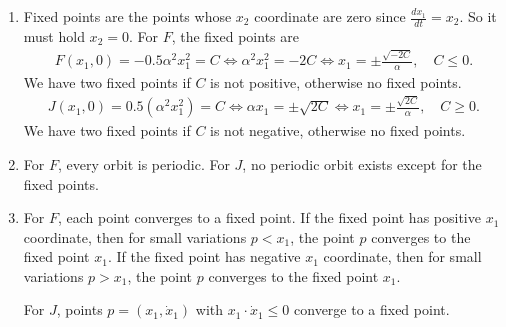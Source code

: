 \documentclass{article}
\theoremstyle{named}
\begin{document}
\begin{enumerate}[label=(\roman*)]
	\item Fixed points are the points whose $x_2$ coordinate are zero since $\frac{dx_1}{dt} = x_2$. So it must hold $x_2 = 0$. For $F$, the fixed points are
	\begin{align*}
		F(x_1,0) = -0.5\alpha^2x_1^2 = C \iff \alpha^2x_1^2 = -2C \iff x_1 = \pm \frac{\sqrt{-2C}}{\alpha}, \quad C \leq 0.
	\end{align*}
	We have two fixed points if $C$ is not positive, otherwise no fixed points.
	\begin{align*}
		J(x_1,0) = 0.5(\alpha^2x_1^2) = C \iff \alpha x_1 = \pm \sqrt{2C} \iff x_1 = \pm \frac{\sqrt{2C}}{\alpha}, \quad C \geq 0.
	\end{align*}
	We have two fixed points if $C$ is not negative, otherwise no fixed points.
	
	\item For $F$, every orbit is periodic. For $J$, no periodic orbit exists except for the fixed points.
	
	\item For $F$, each point converges to a fixed point. If the fixed point has positive $x_1$ coordinate, then for small variations $p < x_1$, the point $p$ converges to the fixed point $x_1$. If the fixed point has negative $x_1$ coordinate, then for small variations $p > x_1$, the point $p$ converges to the fixed point $x_1$.
	
	For $J$, points $p=(x_1,\dot x_1)$ with $x_1 \cdot \dot x_1 \leq 0$ converge to a fixed point.
\end{enumerate}
\end{document}
